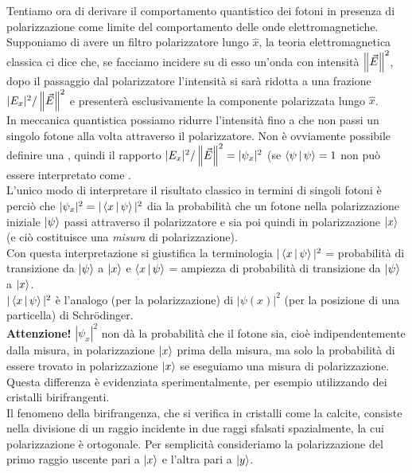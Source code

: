 \documentclass[FisicaTeorica.tex]{subfiles}
\begin{document}
Tentiamo ora di derivare il comportamento quantistico dei fotoni in presenza di polarizzazione come limite  del comportamento delle onde elettromagnetiche.\\
Supponiamo di avere un filtro polarizzatore lungo $\hat{x}$, la teoria elettromagnetica classica ci dice che, se facciamo incidere su di esso un'onda con intensità $\left\lVert\vec{E}\right\rVert^2$, dopo il passaggio dal polarizzatore l'intensità si sarà ridotta a una frazione $|E_x|^2/\left\lVert\vec{E}\right\rVert^2$ 
e presenterà esclusivamente la componente polarizzata lungo $\hat{x}$.\\
In meccanica quantistica possiamo ridurre l'intensità fino a che non passi un singolo fotone alla volta attraverso il polarizzatore. Non è ovviamente possibile definire una , quindi il rapporto $|E_x|^2/\left\lVert\vec{E}\right\rVert^2 = |\psi_x|^2$ (se $\Braket{\psi|\psi} = 1$ non può essere interpretato come .\\
L'unico modo di interpretare il risultato classico in termini di singoli fotoni è perciò che $|\psi_x|^2 = |\Braket{x|\psi}|^2$ dia la probabilità che un fotone nella polarizzazione iniziale $\Ket{\psi}$ passi attraverso il polarizzatore e sia poi quindi in polarizzazione $\Ket{x}$ (e ciò costituisce una \textit{misura} di polarizzazione).\\
Con questa interpretazione si giustifica la terminologia $|\Braket{x|\psi}|^2$ = probabilità di transizione da $\Ket{\psi}$ a $\Ket{x}$ e $\Braket{x|\psi}$ = ampiezza di probabilità di transizione da $\Ket{\psi}$ a $\Ket{x}$.\\
$|\Braket{x|\psi}|^2$ è l'analogo (per la polarizzazione) di $|\psi(x)|^2$ (per la posizione di una particella) di Schrödinger.\\
\textbf{Attenzione!} $|\psi_x|^2$ non dà la probabilità che il fotone sia, cioè indipendentemente dalla misura, in polarizzazione $\Ket{x}$ prima della misura, ma solo la probabilità di essere trovato in polarizzazione $\Ket{x}$ se eseguiamo una misura di  polarizzazione.\\ 
Questa differenza è evidenziata sperimentalmente, per esempio utilizzando dei cristalli birifrangenti.\\
Il fenomeno della birifrangenza, che si verifica in cristalli come la calcite, consiste nella divisione di un raggio incidente in due raggi sfalsati spazialmente, la cui polarizzazione è ortogonale. Per semplicità consideriamo la polarizzazione del primo raggio uscente pari a $\Ket{x}$ e l'altra pari a $\Ket{y}$.\\
\end{document}
